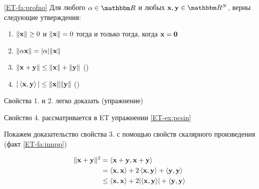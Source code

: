     


\begin{frame}
    
    \vspace{2em}
    \Fact\eqref{ET-fa:profno} Для любого $\alpha \in \RR$ и любых $\boldx, \boldy \in \RR^N$, верны следующие утверждения:
    \begin{enumerate}
        \item $\| {\mathbf x} \| \geq 0$ и $\| {\mathbf x} \| = 0$ тогда и только тогда, когда
            ${\mathbf x} = {\mathbf 0}$
            \vspace{1em}
        \item $\| \alpha {\mathbf x} \| = |\alpha| \| {\mathbf x} \|$
            \vspace{1em}
        \item $\| {\mathbf x} + {\mathbf y} \| \leq  \| {\mathbf x} \| + \| {\mathbf y} \|$
            ()
            \vspace{1em}
        \item $|\left\langle{ {\mathbf x} ,  {\mathbf y} }\right\rangle| \leq  \| {\mathbf x} \| \| {\mathbf y} \|$
            ()
    \end{enumerate}

\end{frame}

\begin{frame}

    \vspace{2em}
    Свойства 1. и 2. легко доказать (упражнение)
    
    Свойство 4. рассматривается в ET упражнении \ref{ET-ex:pcsin}
    
    \vspace{.7em}
    Покажем доказательство свойства 3. с помощью свойств скалярного произведения (факт \ref{ET-fa:innpp})
    
    \begin{align*}
        \label{eq:tifcs}
         \| {\mathbf x} + {\mathbf y} \|^2
        & = \left\langle{ {\mathbf x} +  {\mathbf y} ,  {\mathbf x} +  {\mathbf y} }\right\rangle
        \\& = \left\langle{ {\mathbf x} ,  {\mathbf x} }\right\rangle + 2 \left\langle{ {\mathbf x} ,  {\mathbf y} }\right\rangle +  \left\langle{ {\mathbf y} ,
         {\mathbf y} }\right\rangle
        \\& \leq \left\langle{ {\mathbf x} ,  {\mathbf x} }\right\rangle + 2 | \! \left\langle{ {\mathbf x} ,  {\mathbf y} }\right\rangle \! | +  \left\langle{ {\mathbf y} ,
         {\mathbf y} }\right\rangle
    \end{align*}
\end{frame}

